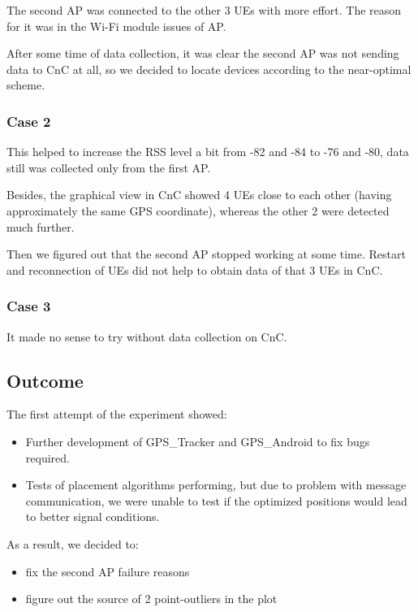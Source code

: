 The second AP was connected to the other 3 UEs with more effort. The
reason for it was in the Wi-Fi module issues of AP.

After some time of data collection, it was clear the second AP was not
sending data to CnC at all, so we decided to locate devices according to
the near-optimal scheme.

\hypertarget{case-2}{%
\subsubsection{Case 2}\label{case-2}}

This helped to increase the RSS level a bit from -82 and -84 to -76 and
-80, data still was collected only from the first AP.

Besides, the graphical view in CnC showed 4 UEs close to each other
(having approximately the same GPS coordinate), whereas the other 2 were
detected much further.

Then we figured out that the second AP stopped working at some time.
Restart and reconnection of UEs did not help to obtain data of that 3
UEs in CnC.

\hypertarget{case-3}{%
\subsubsection{Case 3}\label{case-3}}

It made no sense to try without data collection on CnC.

\hypertarget{outcome}{%
\subsection{Outcome}\label{outcome}}

The first attempt of the experiment showed:

\begin{itemize}
\tightlist
\item
  Further development of GPS\_Tracker and GPS\_Android to fix bugs
  required.
\item
  Tests of placement algorithms performing, but due to problem with
  message communication, we were unable to test if the optimized
  positions would lead to better signal conditions.
\end{itemize}

As a result, we decided to:

\begin{itemize}
\tightlist
\item
  fix the second AP failure reasons
\item
  figure out the source of 2 point-outliers in the plot
\end{itemize}
